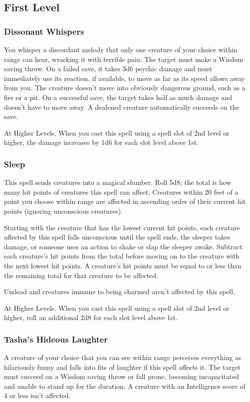 \documentclass[11pt]{article}
\begin{document}
\subsection{First Level}
\label{sec:orgd4d27d2}
\subsubsection{Dissonant Whispers}
\label{sec:org43c8d20}
You whisper a discordant melody that only one creature of your choice within range can hear, wracking it with terrible pain. The target must make a Wisdom saving throw. On a failed save, it takes 3d6 psychic damage and must immediately use its reaction, if available, to move as far as its speed allows away from you. The creature doesn't move into obviously dangerous ground, such as a fire or a pit. On a successful save, the target takes half as much damage and doesn't have to move away. A deafened creature automatically succeeds on the save.

At Higher Levels. When you cast this spell using a spell slot of 2nd level or higher, the damage increases by 1d6 for each slot level above 1st.
\subsubsection{Sleep}
\label{sec:orgb2fc6e5}
This spell sends creatures into a magical slumber. Roll 5d8; the total is how many hit points of creatures this spell can affect. Creatures within 20 feet of a point you choose within range are affected in ascending order of their current hit points (ignoring unconscious creatures).

Starting with the creature that has the lowest current hit points, each creature affected by this spell falls unconscious until the spell ends, the sleeper takes damage, or someone uses an action to shake or slap the sleeper awake. Subtract each creature's hit points from the total before moving on to the creature with the next lowest hit points. A creature's hit points must be equal to or less than the remaining total for that creature to be affected.

Undead and creatures immune to being charmed aren't affected by this spell.

At Higher Levels. When you cast this spell using a spell slot of 2nd level or higher, roll an additional 2d8 for each slot level above 1st.
\subsubsection{Tasha's Hideous Laughter}
\label{sec:orgf14ad3b}
A creature of your choice that you can see within range perceives everything as hilariously funny and falls into fits of laughter if this spell affects it. The target must succeed on a Wisdom saving throw or fall prone, becoming incapacitated and unable to stand up for the duration. A creature with an Intelligence score of 4 or less isn't affected.
\end{document}
